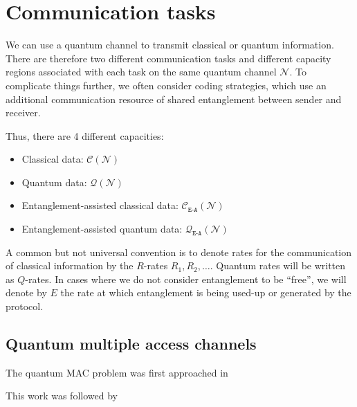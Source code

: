 \documentclass[aps,11pt,twoside,letterpaper]{article}
\begin{document}
	\section{Communication tasks}
			
		We can use a quantum channel to transmit classical or quantum information.
		There are therefore two different communication tasks and different capacity regions
		associated with each task on the same quantum channel $\mathcal{N}$.
		To complicate things further, we often consider coding strategies, which use an additional
		communication resource of shared entanglement  between sender	and receiver.
		
		Thus, there are 4 different capacities:
		\begin{itemize}
			\item Classical data: $\mathcal{C}\!\left(\mathcal{N}\right)$ \vspace{-0.1in}
			\item Quantum data: $\mathcal{Q}\!\left(\mathcal{N}\right)$ \vspace{-0.1in}
			\item Entanglement-assisted classical data: $\mathcal{C}_{\texttt{E-A}}\!\left(\mathcal{N}\right)$ \vspace{-0.1in}
			\item Entanglement-assisted quantum data: $\mathcal{Q}_{\texttt{E-A}}\!\left(\mathcal{N}\right)$
		\end{itemize}
	
		A common but not universal convention is to denote rates for the communication
		of classical information by the $R$-rates $R_1,R_2,\ldots$. 
		Quantum rates will be written as  $Q$-rates.
		In cases where we do not consider entanglement to be ``free'', we will 
		denote by $E$ the rate at which entanglement is being used-up or generated
		by the protocol.
		
		
	\subsection{Quantum multiple access channels}
	
		 The quantum MAC problem was first approached in  \cite{huang2000classical}
		
		
		 This work was followed by \cite{winter2001capacity}
		 
\end{document}
